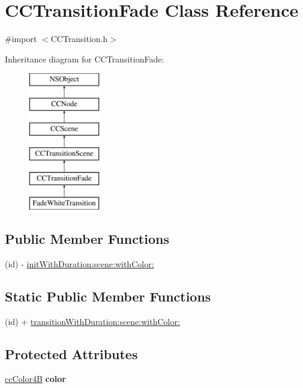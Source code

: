 \hypertarget{interface_c_c_transition_fade}{\section{C\-C\-Transition\-Fade Class Reference}
\label{interface_c_c_transition_fade}
}


{\ttfamily \#import $<$C\-C\-Transition.\-h$>$}

Inheritance diagram for C\-C\-Transition\-Fade\-:\begin{figure}[H]
\begin{center}
\leavevmode
\includegraphics[height=6.000000cm]{interface_c_c_transition_fade}
\end{center}
\end{figure}
\subsection*{Public Member Functions}
\begin{DoxyCompactItemize}
\item 
(id) -\/ \hyperlink{interface_c_c_transition_fade_a757a57ad6e872e6139583406139a8b33}{init\-With\-Duration\-:scene\-:with\-Color\-:}
\end{DoxyCompactItemize}
\subsection*{Static Public Member Functions}
\begin{DoxyCompactItemize}
\item 
(id) + \hyperlink{interface_c_c_transition_fade_a110da4c930b7807da9065ce039820b8c}{transition\-With\-Duration\-:scene\-:with\-Color\-:}
\end{DoxyCompactItemize}
\subsection*{Protected Attributes}
\begin{DoxyCompactItemize}
\item 
\hypertarget{interface_c_c_transition_fade_aec23f69ae7486a77bab76663821ff2a2}{\hyperlink{cc_types_8h_a2f83e39e0378b79d089014c140169793}{cc\-Color4\-B} {\bfseries color}}\label{interface_c_c_transition_fade_aec23f69ae7486a77bab76663821ff2a2}

\end{DoxyCompactItemize}


